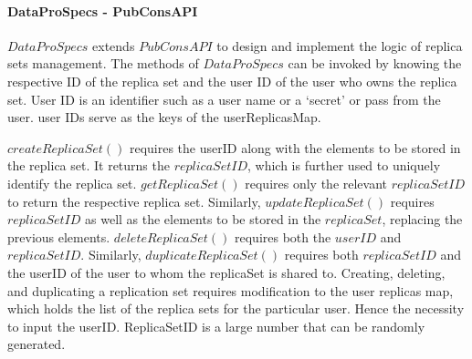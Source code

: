 \documentclass[letterpaper, 10 pt, conference]{ieeeconf}  %
\begin{document}
\paragraph*{DataProSpecs - PubConsAPI}
$DataProSpecs$ extends $PubConsAPI$ to design and implement the logic of replica sets management. The methods of $DataProSpecs$ can be invoked by knowing the respective ID of the replica set and the user ID of the user who owns the replica set. User ID is an identifier such as a user name or a `secret' or pass from the user. user IDs serve as the keys of the userReplicasMap. 

$createReplicaSet()$ requires the userID along with the elements to be stored in the replica set. It returns the $replicaSetID$, which is further used to uniquely identify the replica set. $getReplicaSet()$ requires only the relevant $replicaSetID$ to return the respective replica set. Similarly, $updateReplicaSet()$ requires $replicaSetID$ as well as the elements to be stored in the $replicaSet$, replacing the previous elements. $deleteReplicaSet()$ requires both the $userID$ and $replicaSetID$. Similarly, $duplicateReplicaSet()$ requires both $replicaSetID$ and the userID of the user to whom the replicaSet is shared to. Creating, deleting, and duplicating a replication set requires modification to the user replicas map, which holds the list of the replica sets for the particular user. Hence the necessity to input the userID. ReplicaSetID is a large number that can be randomly generated.
\end{document}
